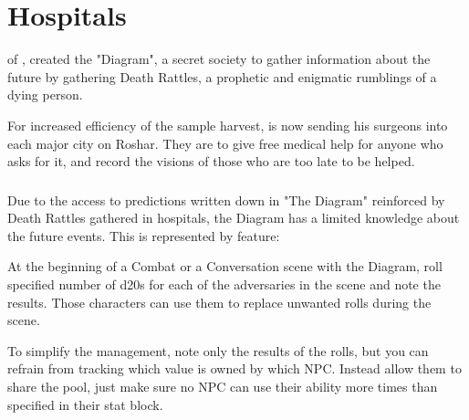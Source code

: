 \section{\locationKharbranth{} Hospitals}
\label{enemyFractionDiagram}

\npcTaravangian{} of \locationKharbranth{}, created the "Diagram", a secret society to gather information about the future by gathering Death Rattles, a prophetic and enigmatic rumblings of a dying person.

For increased efficiency of the sample harvest, \npcTaravangian{} is now sending his surgeons into each major city on Roshar. They are to give free medical help for anyone who asks for it, and record the visions of those who are too late to be helped.



\subsubsection{\abilityFutureKnowledgeName{}}

Due to the access to predictions written down in "The Diagram" reinforced by Death Rattles gathered in \locationKharbranth{} hospitals, the Diagram has a limited knowledge about the future events. This is represented by \abilityFutureKnowledgeName{} feature:

\abilityFutureKnowledge{}

At the beginning of a Combat or a Conversation scene with the Diagram, roll specified number of d20s for each of the adversaries in the scene and note the results. Those characters can use them to replace unwanted rolls during the scene.

To simplify the management, note only the results of the rolls, but you can refrain from tracking which value is owned by which NPC. Instead allow them to share the pool, just make sure no NPC can use their ability more times than specified in their stat block.


\newpage

\newpage

\newpage

\newpage
